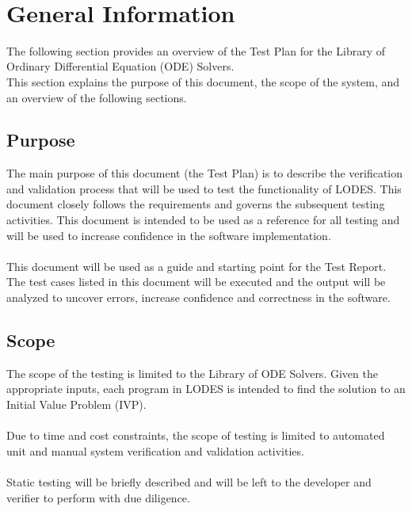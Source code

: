 \documentclass[12pt, titlepage]{article}
\newcommand{\famname}{LODES} %
\newcommand{\famdesc}{Library of ODE Solvers}
\begin{document}
~\newpage

\tableofcontents

\listoftables

\listoffigures

\newpage



\section{General Information}
The following section provides an overview of the Test Plan for the Library of Ordinary Differential Equation (ODE) Solvers.\\
This section explains the purpose of this document, the scope of the system, and an overview of the following sections.

\subsection{Purpose}
The main purpose of this document (the Test Plan) is to describe the verification and validation process that will be used to test the
functionality of \famname{}.  This document closely follows the requirements and governs the subsequent testing activities.
This document is intended to be used as a reference for all testing and will be used to increase confidence in the software implementation.\\
\\
This document will be used as a guide and starting point for the Test Report. The test cases
listed in this document will be executed and the output will be analyzed to uncover errors, increase confidence and correctness in the software.

\subsection{Scope}
The scope of the testing is limited to the \famdesc{}. Given the appropriate inputs, each program in \famname{} is intended to find
the solution to an Initial Value Problem (IVP).\\
\\
Due to time and cost constraints, the scope of testing is limited to automated unit and manual system verification and validation activities.\\
\\
Static testing will be briefly described and will be left to the developer and verifier to perform with due diligence.
\end{document}
